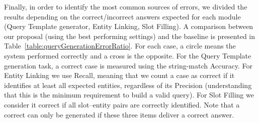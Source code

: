 Finally, in order to identify the most common sources of errors, we divided the results depending 
on the correct/incorrect answers expected for each module (Query Template generator, Entity Linking, 
Slot Filling). A comparison between our proposal (using the best performing settings) and the 
baseline is presented in Table~\ref{table:queryGenerationErrorRatio}. For each case, a circle 
means the system performed correctly and a cross is the opposite. For the Query Template 
generation task, a correct case is measured using the string-match Accuracy. For Entity Linking 
we use Recall, meaning that we count a case as correct if it identifies at least all expected 
entities, regardless of its Precision (understanding that this is the minimum requirement to 
build a valid \SPARQL{} query). For Slot Filling we consider it correct if all slot--entity pairs 
are correctly identified. Note that a correct \SPARQL{} can only be generated if these three items 
deliver a correct answer.

